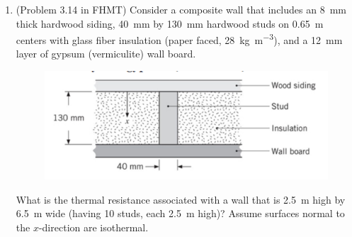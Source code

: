 \documentclass[12pt,letterpaper]{article}
\begin{document}
\begin{enumerate}
\item (Problem 3.14 in FHMT) Consider a composite wall that includes an \SI{8}{\milli\meter} thick hardwood siding, \SI{40}{\milli\meter} by \SI{130}{\milli\meter} hardwood studs on \SI{0.65}{\meter} centers with glass fiber insulation (paper faced, \SI{28}{\kilogram\per\cubic\meter}), and a \SI{12}{\milli\meter} layer of gypsum (vermiculite) wall board.

\begin{figure}[!htpb]
	\centering
	\includegraphics[width=0.75\linewidth]{./image1.png}
\end{figure}

\noindent
What is the thermal resistance associated with a wall that is \SI{2.5}{\meter} high by \SI{6.5}{\meter} wide (having 10 studs, each \SI{2.5}{\meter} high)?
Assume surfaces normal to the $x$-direction are isothermal.

%
%


\end{enumerate}
\end{document}
